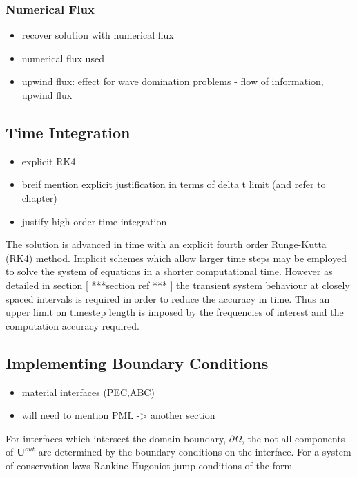 \subsubsection{Numerical Flux}

\begin{itemize}
	\item recover solution with numerical flux
  \item numerical flux used
	\item upwind flux: effect for wave domination problems - flow of information, upwind flux
\end{itemize}

\subsection{Time Integration}
\begin{itemize}
	\item explicit RK4
	\item breif mention explicit justification in terms of delta t limit (and refer to chapter)
	\item justify high-order time integration
\end{itemize}

The solution is advanced in time with an explicit fourth order Runge-Kutta (RK4) method. Implicit schemes which allow larger time steps may be employed to solve the system of equations in a shorter computational time. However as detailed in section [ ***section ref *** ] the transient system behaviour at closely spaced intervals is required in order to reduce the accuracy in time. Thus an upper limit on timestep length is imposed by the frequencies of interest and the computation accuracy required.

\subsection{Implementing Boundary Conditions}
\begin{itemize}
	\item material interfaces (PEC,ABC)
  \item will need to mention PML -> another section
\end{itemize}

For interfaces which intersect the domain boundary, $\partial \Omega$, the not all components of $\mathbf{U}^{out}$ are determined by the boundary conditions on the interface. For a system of conservation laws Rankine-Hugoniot jump conditions of the form

